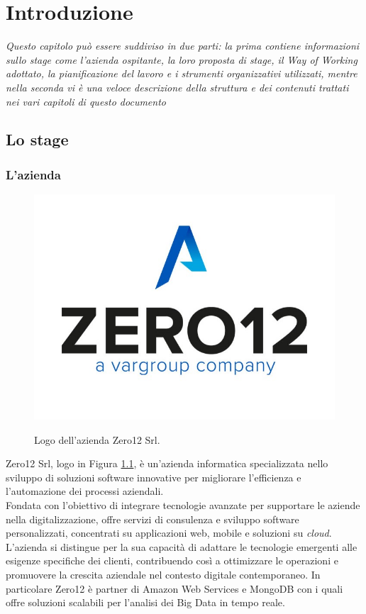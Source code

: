 \chapter{Introduzione}
\label{chap:introduzione}

\textit{Questo capitolo può essere suddiviso in due parti: la prima contiene informazioni sullo stage come l'azienda ospitante, la loro proposta di stage, il Way of Working adottato, la pianificazione del lavoro e i strumenti organizzativi utilizzati,  mentre nella seconda vi è una veloce descrizione della struttura e dei contenuti trattati nei vari capitoli di questo documento}

\section{Lo stage}
\subsection{L'azienda}

\begin{figure}[H]
    \centering
    \includegraphics[alt={Logo dell'azienda Zero12 Srl}, width=0.5\columnwidth]{img/zero12Logo.jpg}
    \caption{Logo dell'azienda Zero12 Srl.}
    \label{fig:company_logo}
\end{figure}

Zero12 Srl, logo in Figura \ref{fig:company_logo}, è un'azienda informatica specializzata nello sviluppo 
di soluzioni software innovative per migliorare l'efficienza e l'automazione dei processi aziendali.\\
Fondata con l'obiettivo di integrare tecnologie avanzate per supportare le aziende nella 
digitalizzazione, offre servizi di consulenza e sviluppo software personalizzati, 
concentrati su applicazioni web, mobile e soluzioni su \textit{cloud}.\\
L'azienda si distingue per la sua capacità di adattare le tecnologie emergenti alle 
esigenze specifiche dei clienti, contribuendo così a ottimizzare le operazioni e 
promuovere la crescita aziendale nel contesto digitale contemporaneo. 
In particolare Zero12 è partner di Amazon Web Services e MongoDB con i quali offre 
soluzioni scalabili per l'analisi dei Big Data in tempo reale. 

